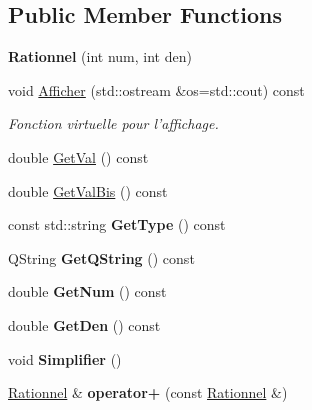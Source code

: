 \subsection*{Public Member Functions}
\begin{DoxyCompactItemize}
\item 
\hypertarget{class_rationnel_afac9e543020a4611f5c217a01f3c0a7e}{{\bfseries Rationnel} (int num, int den)}\label{class_rationnel_afac9e543020a4611f5c217a01f3c0a7e}

\item 
void \hyperlink{class_rationnel_a52b4a6398d50e630ad76be8be0185f9f}{Afficher} (std\-::ostream \&os=std\-::cout) const 
\begin{DoxyCompactList}\small\item\em Fonction virtuelle pour l'affichage. \end{DoxyCompactList}\item 
double \hyperlink{class_rationnel_a29987744cb2a7631ffa4db708630fe19}{Get\-Val} () const 
\item 
double \hyperlink{class_rationnel_a2403f411e88b3de9f83ad735342e68ec}{Get\-Val\-Bis} () const 
\item 
\hypertarget{class_rationnel_a8c04071cda8dbe6f2b13db3e48d1bedb}{const std\-::string {\bfseries Get\-Type} () const }\label{class_rationnel_a8c04071cda8dbe6f2b13db3e48d1bedb}

\item 
\hypertarget{class_rationnel_af3d40b73dc2dd7ca6e978fe5ddb0c945}{Q\-String {\bfseries Get\-Q\-String} () const }\label{class_rationnel_af3d40b73dc2dd7ca6e978fe5ddb0c945}

\item 
\hypertarget{class_rationnel_a07ba81e61e4186ada00f3da12bb24ffc}{double {\bfseries Get\-Num} () const }\label{class_rationnel_a07ba81e61e4186ada00f3da12bb24ffc}

\item 
\hypertarget{class_rationnel_ab2791ae061c2c27af018830c1564fb4c}{double {\bfseries Get\-Den} () const }\label{class_rationnel_ab2791ae061c2c27af018830c1564fb4c}

\item 
\hypertarget{class_rationnel_ab86742d127646fff7096e04c0882e00d}{void {\bfseries Simplifier} ()}\label{class_rationnel_ab86742d127646fff7096e04c0882e00d}

\item 
\hypertarget{class_rationnel_a7f8c5581a3127a63c4e1d607f67c2c41}{\hyperlink{class_rationnel}{Rationnel} \& {\bfseries operator+} (const \hyperlink{class_rationnel}{Rationnel} \&)}\label{class_rationnel_a7f8c5581a3127a63c4e1d607f67c2c41}


\end{DoxyCompactItemize}

